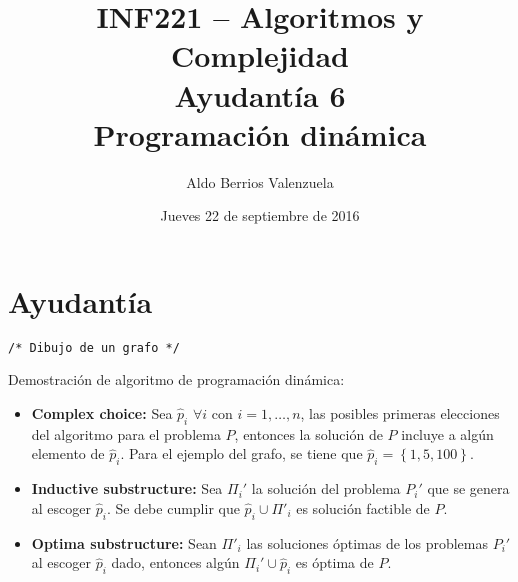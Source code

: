 \documentclass[english, spanish, fleqn, 10pt]{article}
\title{INF221 -- Algoritmos y Complejidad\\[.4\baselineskip]Ayudantía 6\\Programación dinámica}
\author{Aldo Berrios Valenzuela}
\date{Jueves 22 de septiembre de 2016}
\newcommand{\comentarioc}[1]{\texttt{\textcolor{webred}{/* #1 */}}}
\numberwithin{equation}{section}
\newcommand{\llaves}[1]{\left \{ #1 \right \}}
\theoremstyle{definition}
\begin{document}
\maketitle
\section{Ayudantía}
\begin{center}
        \comentarioc{Dibujo de un grafo}
\end{center}
Demostración de algoritmo de programación dinámica:
\begin{itemize}
        \item \textbf{Complex choice:} Sea $\hat p_i$ $\forall i$ con $i=1, \ldots, n$, las posibles primeras elecciones del algoritmo para el problema $P$, entonces la solución de $P$ incluye a algún elemento de $\hat p_i$. Para el ejemplo del grafo, se tiene que $\hat p_i=\llaves{1, 5, 100}$.

        \item \textbf{Inductive substructure:} Sea $\Pi_i'$ la solución del problema $P_i'$ que se genera al escoger $\hat p_i$. Se debe cumplir que $\hat p_i\cup \Pi'_i$ es solución factible de $P$.

        \item \textbf{Optima substructure:} Sean $\Pi'_i$ las soluciones óptimas de los problemas $P_i'$ al escoger $\hat p_i$ dado, entonces algún $\Pi_i'\cup\hat p_i$ es óptima de $P$.
\end{itemize}
\end{document}
